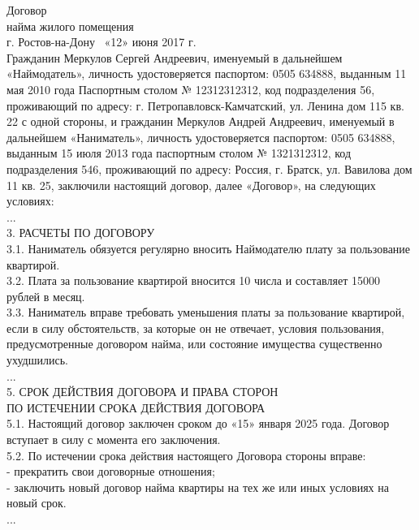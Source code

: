 \begin{myexample}
\label{agr22}
Договор \\
найма жилого помещения\\

г. Ростов-на-Дону               \                                          «12» июня 2017 г.\\

     Гражданин Меркулов Сергей Андреевич, именуемый в дальнейшем «Наймодатель»,  личность  удостоверяется  паспортом: 0505  634888, выданным 11 мая 2010 года Паспортным столом № 12312312312, код подразделения 56, проживающий по адресу: г. Петропавловск-Камчатский, ул. Ленина дом 115 кв. 22 с одной стороны, и гражданин Меркулов Андрей Андреевич, именуемый в дальнейшем «Наниматель»,  личность  удостоверяется  паспортом:   0505  634888,  выданным 15 июля 2013 года паспортным столом № 1321312312, код подразделения 546, проживающий по адресу: Россия, г. Братск, ул. Вавилова дом 11 кв. 25, заключили настоящий договор, далее «Договор»,  на следующих условиях:\\
...\\
3. РАСЧЕТЫ ПО ДОГОВОРУ\\
3.1. Наниматель обязуется регулярно вносить Наймодателю плату за пользование квартирой.\\
3.2. Плата за пользование квартирой вносится 10 числа и составляет 15000 рублей в месяц.\\
3.3. Наниматель вправе требовать уменьшения платы за пользование квартирой, если в силу обстоятельств, за которые он не отвечает, условия пользования, предусмотренные договором найма, или состояние имущества существенно ухудшились.\\
...\\
5. СРОК ДЕЙСТВИЯ ДОГОВОРА И ПРАВА СТОРОН\\
ПО ИСТЕЧЕНИИ СРОКА ДЕЙСТВИЯ ДОГОВОРА\\
5.1. Настоящий договор заключен сроком до «15» января 2025 года. Договор вступает в силу с момента его заключения.\\
5.2. По истечении срока действия настоящего Договора стороны вправе:\\
- прекратить свои договорные отношения;\\
- заключить новый договор найма квартиры на тех же или иных условиях на новый срок.\\
...\\
\end{myexample}

